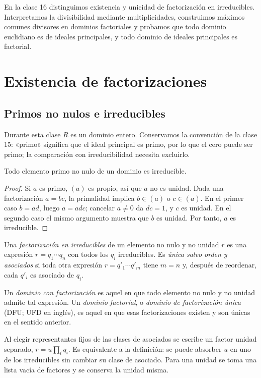 En la clase 16 distinguimos existencia y unicidad de factorización en irreducibles. Interpretamos la divisibilidad mediante multiplicidades, construimos máximos comunes divisores en dominios factoriales y probamos que todo dominio euclidiano es de ideales principales, y todo dominio de ideales principales es factorial.

\section{Existencia de factorizaciones}
\subsection{Primos no nulos e irreducibles}
Durante esta clase $R$ es un dominio entero. Conservamos la convención de la clase 15: «primo» significa que el ideal principal es primo, por lo que el cero puede ser primo; la comparación con irreducibilidad necesita excluirlo.

\begin{lema}\label{lema:C16-primo-irreducible}
Todo elemento primo no nulo de un dominio es irreducible.
\end{lema}
\begin{proof}
Si $a$ es primo, $(a)$ es propio, así que $a$ no es unidad. Dada una factorización $a=bc$, la primalidad implica $b\in(a)$ o $c\in(a)$. En el primer caso $b=ad$, luego $a=adc$; cancelar $a\ne0$ da $dc=1$, y $c$ es unidad. En el segundo caso el mismo argumento muestra que $b$ es unidad. Por tanto, $a$ es irreducible.
\end{proof}

\begin{defi}
Una \emph{factorización en irreducibles} de un elemento no nulo y no unidad $r$ es una expresión $r=q_1\cdots q_n$ con todos los $q_i$ irreducibles. Es \emph{única salvo orden y asociados} si toda otra expresión $r=q'_1\cdots q'_m$ tiene $m=n$ y, después de reordenar, cada $q'_i$ es asociado de $q_i$.

Un \emph{dominio con factorización} es aquel en que todo elemento no nulo y no unidad admite tal expresión. Un \emph{dominio factorial}, o \emph{dominio de factorización única} (DFU; UFD en inglés), es aquel en que esas factorizaciones existen y son únicas en el sentido anterior.
\end{defi}
Al elegir representantes fijos de las clases de asociados se escribe un factor unidad separado, $r=u\prod_i q_i$. Es equivalente a la definición: se puede absorber $u$ en uno de los irreducibles sin cambiar su clase de asociado. Para una unidad se toma una lista vacía de factores y se conserva la unidad misma.

